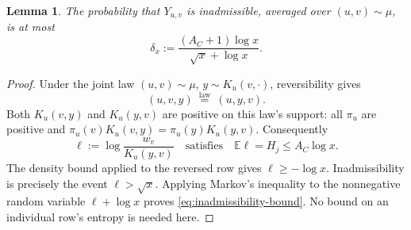 \documentclass[11pt]{article}
\newtheorem{lemma}[theorem]{Lemma}
\theoremstyle{definition}
\theoremstyle{remark}
\numberwithin{equation}{section}
\begin{document}
\begin{lemma}\label{lem:reverse-admissibility}
The probability that $Y_{u,v}$ is inadmissible, averaged over
$(u,v)\sim\mu$, is at most
\begin{equation}\label{eq:inadmissibility-bound}
 \delta_x:=\frac{(A_C+1)\log x}{\sqrt x+\log x}.
\end{equation}
\end{lemma}

\begin{proof}
Under the joint law $(u,v)\sim\mu$, $y\sim K_u(v,\cdot)$,
reversibility gives
\[
 (u,v,y)\ \stackrel{\mathrm{law}}=\ (u,y,v).
\]
Both $K_u(v,y)$ and $K_u(y,v)$ are positive on this law's support:
all $\pi_u$ are positive and
$\pi_u(v)K_u(v,y)=\pi_u(y)K_u(y,v)$.
Consequently
\[
 \ell:=\log\frac{w_v}{K_u(y,v)}
 \quad\text{satisfies}\quad
 \mathbb E\ell=H_j\le A_C\log x.
\]
The density bound applied to the reversed row gives $\ell\ge-\log x$.
Inadmissibility is precisely the event $\ell>\sqrt x$. Applying Markov's
inequality to the nonnegative random variable $\ell+\log x$ proves
\eqref{eq:inadmissibility-bound}. No bound on an individual row's
entropy is needed here.
\end{proof}
\end{document}
